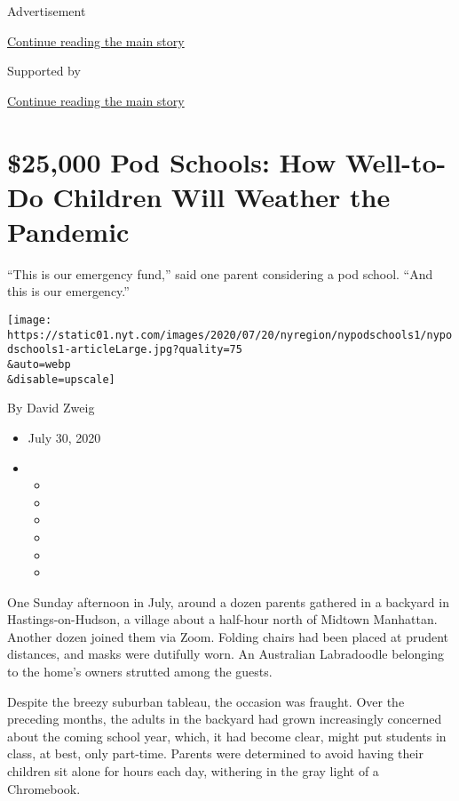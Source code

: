 Advertisement

\protect\hyperlink{after-top}{Continue reading the main story}

Supported by

\protect\hyperlink{after-sponsor}{Continue reading the main story}

\hypertarget{25000-pod-schools-how-well-to-do-children-will-weather-the-pandemic}{%
\section{\$25,000 Pod Schools: How Well-to-Do Children Will Weather the
Pandemic}\label{25000-pod-schools-how-well-to-do-children-will-weather-the-pandemic}}

``This is our emergency fund,'' said one parent considering a pod
school. ``And this is our emergency.''

\texttt{[image: https://static01.nyt.com/images/2020/07/20/nyregion/nypodschools1/nypodschools1-articleLarge.jpg?quality=75\\\&auto=webp\\\&disable=upscale]}

By David Zweig

\begin{itemize}
\item
  July 30, 2020
\item
  \begin{itemize}
  \item
  \item
  \item
  \item
  \item
  \item
  \end{itemize}
\end{itemize}

One Sunday afternoon in July, around a dozen parents gathered in a
backyard in Hastings-on-Hudson, a village about a half-hour north of
Midtown Manhattan. Another dozen joined them via Zoom. Folding chairs
had been placed at prudent distances, and masks were dutifully worn. An
Australian Labradoodle belonging to the home's owners strutted among the
guests.

Despite the breezy suburban tableau, the occasion was fraught. Over the
preceding months, the adults in the backyard had grown increasingly
concerned about the coming school year, which, it had become clear,
might put students in class, at best, only part-time. Parents were
determined to avoid having their children sit alone for hours each day,
withering in the gray light of a Chromebook.

